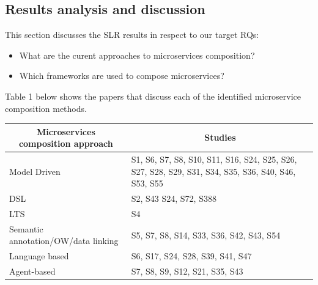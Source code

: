 \documentclass{article}
\begin{document}
\begin{multicols}{2}
\section{Results analysis and discussion}

This section discusses the SLR results in respect to our target RQs:

\begin{itemize}
\item{What are the curent approaches to microservices composition?}
\item{Which frameworks are used to compose microservices?}
\end{itemize}

Table 1 below shows the papers that discuss each of the identified microservice composition methods.

\begin{table}[ht!]
\begin{center}
\scriptsize
\begin{tabular}{ | m{20em} | m{20em} | }
\hline
\multicolumn{1}{|c|}{\textbf{Microservices composition approach}} & \multicolumn{1}{c|}{\textbf{Studies}}                                                                   \\ \hline
Model Driven                                                      & S1,   S6, S7, S8, S10, S11, S16, S24, S25, S26, S27, S28, S29, S31, S34, S35, S36,   S40, S46, S53, S55 \\ \hline
DSL                                                               & S2,   S43 S24, S72, S388                                                                                \\ \hline
LTS                                                               & S4                                                                                                      \\ \hline
Semantic   annotation/OW/data linking                             & S5,   S7, S8, S14, S33, S36, S42, S43, S54                                                              \\ \hline
Language   based                                                  & S6,   S17, S24, S28, S39, S41, S47                                                                      \\ \hline
Agent-based                                                       & S7,   S8, S9, S12, S21, S35, S43                                                                        \\ \hline

\end{tabular}
\end{center}
\end{table}
\end{multicols}
\end{document}
